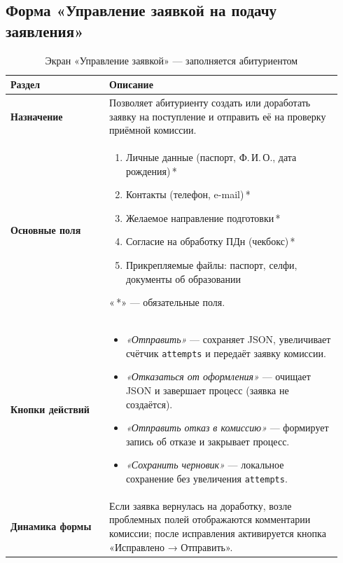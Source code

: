 \documentclass[areasetadvanced]{scrartcl}
\begin{document}
\subsection{Форма «Управление заявкой на подачу заявления»}
\begin{table}[H]
\caption{Экран «Управление заявкой» — заполняется абитуриентом}
\renewcommand{\arraystretch}{1.2}
\begin{tabular}{|p{0.28\linewidth}|p{0.66\linewidth}|}
\hline
\textbf{Раздел} & \textbf{Описание} \\ \hline
\textbf{Назначение} &
Позволяет абитуриенту создать или доработать заявку на поступление и отправить её на проверку приёмной комиссии. \\ \hline

\textbf{Основные поля} &
\begin{enumerate}
  \item Личные данные (паспорт, Ф.\,И.\,О., дата рождения)\,*  
  \item Контакты (телефон, e-mail)\,*  
  \item Желаемое направление подготовки\,*  
  \item Согласие на обработку ПДн (чекбокс)\,*  
  \item Прикрепляемые файлы: паспорт, селфи, документы об образовании
\end{enumerate} «\,*» — обязательные поля. \\ \hline

\textbf{Кнопки действий} &
\begin{itemize}
  \item \emph{«Отправить»} — сохраняет JSON, увеличивает счётчик \texttt{attempts} и передаёт заявку комиссии.
  \item \emph{«Отказаться от оформления»} — очищает JSON и завершает процесс (заявка не создаётся).
  \item \emph{«Отправить отказ в комиссию»} — формирует запись об отказе и закрывает процесс.
  \item \emph{«Сохранить черновик»} — локальное сохранение без увеличения \texttt{attempts}.
\end{itemize} \\ \hline

\textbf{Динамика формы} &
Если заявка вернулась на доработку, возле проблемных полей отображаются комментарии комиссии; после исправления активируется кнопка «Исправлено → Отправить». \\ \hline
\end{tabular}
\end{table}
\end{document}
